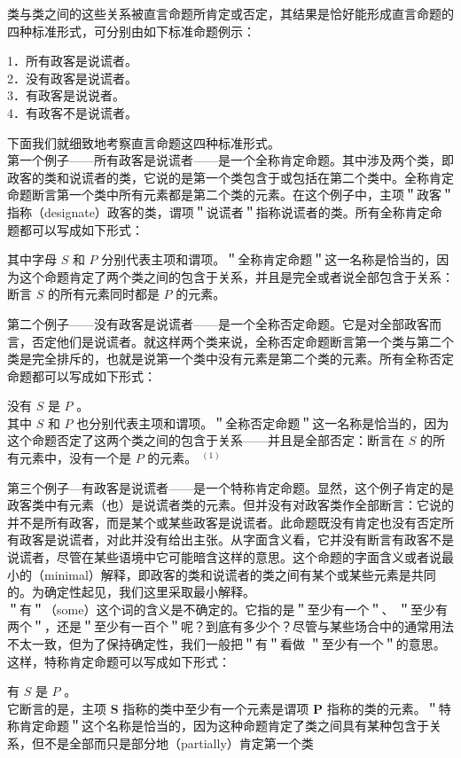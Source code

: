 类与类之间的这些关系被直言命题所肯定或否定，其结果是恰好能形成直言命题的四种标准形式，可分别由如下标准命题例示：

1．所有政客是说谎者。\\
2．没有政客是说谎者。\\
3．有政客是说说者。\\
4．有政客不是说谎者。

下面我们就细致地考察直言命题这四种标准形式。\\
第一个例子——所有政客是说谎者——是一个全称肯定命题。其中涉及两个类，即政客的类和说谎者的类，它说的是第一个类包含于或包括在第二个类中。全称肯定命题断言第一个类中所有元素都是第二个类的元素。在这个例子中，主项＂政客＂指称（designate）政客的类，谓项＂说谎者＂指称说谎者的类。所有全称肯定命题都可以写成如下形式：

其中字母 $S$ 和 $P$ 分别代表主项和谓项。＂全称肯定命题＂这一名称是恰当的，因为这个命题肯定了两个类之间的包含于关系，并且是完全或者说全部包含于关系：断言 $S$ 的所有元素同时都是 $P$ 的元素。

第二个例子——没有政客是说谎者——是一个全称否定命题。它是对全部政客而言，否定他们是说谎者。就这样两个类来说，全称否定命题断言第一个类与第二个类是完全排斥的，也就是说第一个类中没有元素是第二个类的元素。所有全称否定命题都可以写成如下形式：

没有 $S$ 是 $P$ 。\\
其中 $S$ 和 $P$ 也分别代表主项和谓项。＂全称否定命题＂这一名称是恰当的，因为这个命题否定了这两个类之间的包含于关系——并且是全部否定：断言在 $S$ 的所有元素中，没有一个是 $P$ 的元素。 ${ }^{(1)}$

第三个例子—有政客是说谎者——是一个特称肯定命题。显然，这个例子肯定的是政客类中有元素（也）是说谎者类的元素。但并没有对政客类作全部断言：它说的并不是所有政客，而是某个或某些政客是说谎者。此命题既没有肯定也没有否定所有政客是说谎者，对此并没有给出主张。从字面含义看，它并没有断言有政客不是说谎者，尽管在某些语境中它可能暗含这样的意思。这个命题的字面含义或者说最小的（minimal）解释，即政客的类和说谎者的类之间有某个或某些元素是共同的。为确定性起见，我们这里采取最小解释。\\
＂有＂（some）这个词的含义是不确定的。它指的是＂至少有一个＂、 ＂至少有两个＂，还是＂至少有一百个＂呢？到底有多少个？尽管与某些场合中的通常用法不太一致，但为了保持确定性，我们一般把＂有＂看做 ＂至少有一个＂的意思。这样，特称肯定命题可以写成如下形式：

有 $S$ 是 $P$ 。\\
它断言的是，主项 $\boldsymbol{S}$ 指称的类中至少有一个元素是谓项 $\boldsymbol{P}$ 指称的类的元素。＂特称肯定命题＂这个名称是恰当的，因为这种命题肯定了类之间具有某种包含于关系，但不是全部而只是部分地（partially）肯定第一个类

